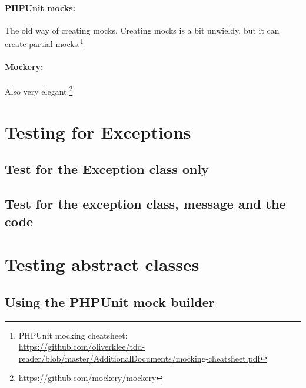 \documentclass[a4paper,10pt,headsepline]{scrartcl}
\begin{document}
\paragraph{PHPUnit mocks:} The old way of creating mocks. Creating mocks is a bit unwieldy, but it can create partial mocks.\footnote{PHPUnit mocking cheatsheet:\\ \url{https://github.com/oliverklee/tdd-reader/blob/master/AdditionalDocuments/mocking-cheatsheet.pdf}}
\paragraph{Mockery:} Also very elegant.\footnote{\url{https://github.com/mockery/mockery}}


\pagebreak
\section{Testing for Exceptions}

\subsection{Test for the Exception class only}

\subsection{Test for the exception class, message and the code}


\pagebreak
\section{Testing abstract classes}

\subsection{Using the PHPUnit mock builder}
\end{document}
